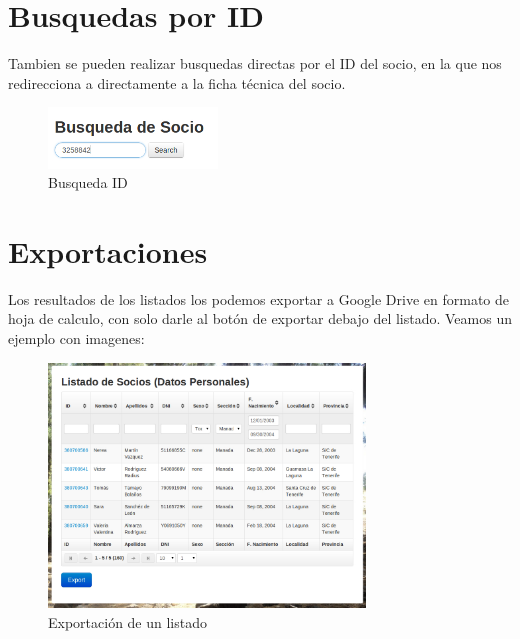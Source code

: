 \section{Busquedas por ID}
\label{3:sec5}

Tambien se pueden realizar busquedas directas por el ID del socio, en la que nos redirecciona a directamente  a la ficha técnica del socio.\\

\begin{figure}[H]
\begin{center}
\includegraphics[width=0.40\textwidth]{images/busqueda_id.jpg}
\caption{Busqueda ID}
\label{fig:ArbolBinario}
\end{center}
\end{figure}

\section{Exportaciones}
\label{3:sec6}

Los resultados de los listados los podemos exportar a Google Drive en formato de hoja de calculo, con solo darle al botón de exportar debajo del listado. Veamos un ejemplo con imagenes:\\

\begin{figure}[H]
\begin{center}
\includegraphics[width=0.75\textwidth]{images/listado_export.jpg}
\caption{Exportación de un listado}
\label{fig:ArbolBinario}
\end{center}
\end{figure}

